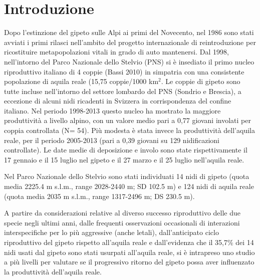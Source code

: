 \section*{Introduzione}

Dopo l{\textquoteright}estinzione del gipeto sulle Alpi ai primi del
Novecento, nel 1986 sono stati avviati i primi rilasci
nell{\textquoteright}ambito del progetto internazionale di
reintroduzione per ricostituire metapopolazioni vitali in grado di auto
mantenersi. Dal 1998, nell{\textquoteright}intorno del Parco Nazionale
dello Stelvio (PNS) si \`e insediato il primo nucleo riproduttivo
italiano di 4 coppie (Bassi 2010) in simpatria con una consistente
popolazione di aquila reale (15,75 coppie/1000 km$^2$. Le
coppie di gipeto sono tutte incluse nell{\textquoteright}intorno del
settore lombardo del PNS (Sondrio e Brescia), a eccezione di alcuni
nidi ricadenti in Svizzera in corrispondenza del confine italiano. Nel
periodo 1998-2013 questo nucleo ha mostrato la maggiore produttivit\`a
a livello alpino, con un valore medio pari a 0,77 giovani involati per
coppia controllata (N= 54). Pi\`u modesta \`e stata invece la
produttivit\`a dell{\textquoteright}aquila reale, per il periodo
2005-2013 (pari a 0,39 giovani su 129 nidificazioni controllate). Le
date medie di deposizione e involo sono state rispettivamente il 17
gennaio e il 15 luglio nel gipeto e il 27 marzo e il 25 luglio
nell{\textquoteright}aquila reale.

Nel Parco Nazionale dello Stelvio sono stati individuati 
14 nidi di gipeto (quota media 2225.4 m
s.l.m., range 2028-2440 m; SD 102.5 m) e 124 nidi di aquila reale
(quota media 2035 m s.l.m., range 1317-2496 m; DS 230.5 m).

A partire da considerazioni relative al diverso successo riproduttivo
delle due specie negli ultimi anni, dalle frequenti osservazioni
occasionali di interazioni interspecifiche per lo pi\`u aggressive
(anche letali), dall{\textquoteright}anticipato ciclo riproduttivo del
gipeto rispetto all{\textquoteright}aquila reale e
dall{\textquoteright}evidenza che il 35,7\% dei 14 nidi usati dal
gipeto sono stati usurpati all{\textquoteright}aquila reale, si \`e
intrapreso uno studio a pi\`u livelli per valutare se il progressivo
ritorno del gipeto possa aver influenzato la produttivit\`a
dell{\textquoteright}aquila reale. 

